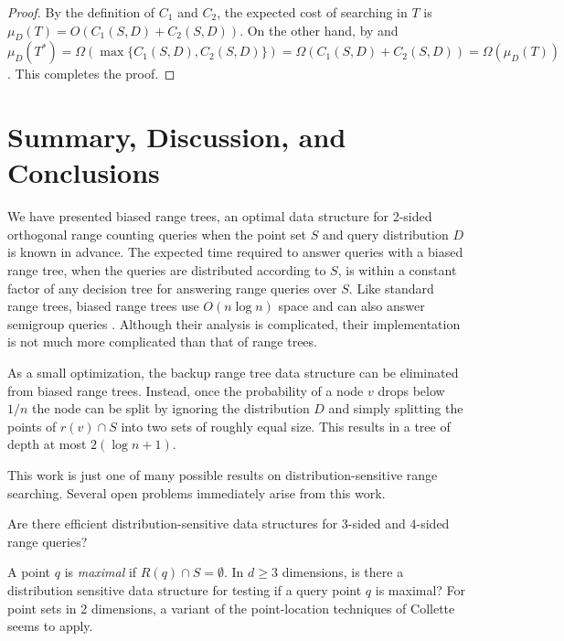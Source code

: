 \documentclass[lotsofwhite,charterfonts]{patmorin}
\begin{document}
\begin{proof}
By the definition of $C_1$ and $C_2$, the expected cost of searching in
$T$ is $\mu_D(T)=O(C_1(S,D)+C_2(S,D))$.  On the other hand, by
 and  $\mu_D(T^*) =
\Omega(\max\{C_1(S,D),C_2(S,D)\}) =
\Omega(C_1(S,D)+C_2(S,D))=\Omega(\mu_D(T))$.  This completes the proof.
\end{proof}

\section{Summary, Discussion, and Conclusions}

We have presented biased range trees, an optimal data structure for
2-sided orthogonal range counting queries when the point set $S$ and
query distribution $D$ is known in advance. The expected time required
to answer queries with a biased range tree, when the queries are
distributed according to $S$, is within a constant factor of any
decision tree for answering range queries over $S$.  Like standard
range trees, biased range trees use $O(n\log n)$ space and can also
answer semigroup queries \cite{ae133,ae292}.  Although their analysis
is complicated, their implementation is not much more complicated than
that of range trees.

As a small optimization, the backup range tree data structure can be
eliminated from biased range trees.  Instead, once the probability of
a node $v$ drops below $1/n$ the node can be split by ignoring the
distribution $D$ and simply splitting the points of $r(v)\cap S$ into
two sets of roughly equal size.  This results in a tree of depth at
most $2(\log n+1)$.

This work is just one of many possible results on
distribution-sensitive range searching.  Several open problems
immediately arise from this work.

\begin{op}
Are there efficient distribution-sensitive data structures for 3-sided
and 4-sided range queries?
\end{op}

\begin{op}
A point $q$ is \emph{maximal} if $R(q)\cap S=\emptyset$.  In $d\ge 3$
dimensions,  is there a distribution sensitive data structure for
testing if a query point $q$ is maximal?  For point sets in 2
dimensions, a variant of the point-location techniques of Collette
\etal\ \cite{cdilm08} seems to apply. 
\end{op}
\end{document}
